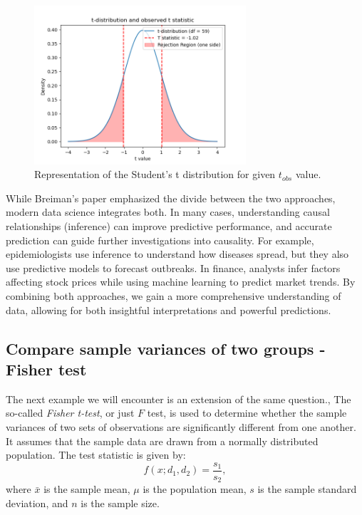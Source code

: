 \documentclass{book}
\begin{document}
\begin{figure}[ht]
    \centering
    \includegraphics[width=0.7\textwidth]{figures/chapter4/t_2_samples_distribution.png}
    \caption{Representation of the Student's t distribution for given $t_{obs}$ value.}
    \label{fig:t_2_sample_obs}
\end{figure}

While Breiman’s paper emphasized the divide between the two approaches, modern data science integrates both. In many cases, understanding causal relationships (inference) can improve predictive performance, and accurate prediction can guide further investigations into causality. For example, epidemiologists use inference to understand how diseases spread, but they also use predictive models to forecast outbreaks. In finance, analysts infer factors affecting stock prices while using machine learning to predict market trends. By combining both approaches, we gain a more comprehensive understanding of data, allowing for both insightful interpretations and powerful predictions.

\newpage
\subsection{Compare sample variances of two groups - Fisher test}

The next example we will encounter is an extension of the same question., The so-called \textit{Fisher t-test}, or just $F$ test, is used to determine whether the sample variances of two sets of observations are significantly different from one another. It assumes that the sample data are drawn from a normally distributed population. The test statistic is given by:
\[
    f(x; d_{1}, d_{2}) = \frac{s_1}{s_2},
\]
where $\bar{x}$ is the sample mean, $\mu$ is the population mean, $s$ is the sample standard deviation, and $n$ is the sample size.
\end{document}

